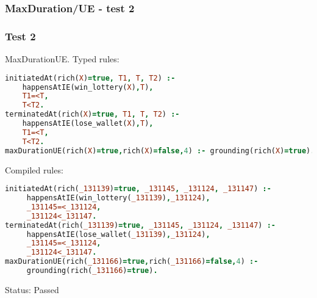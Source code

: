 \documentclass[8pt]{beamer}
\begin{document}
\begin{frame}[fragile]
\frametitle{MaxDuration/UE - test 2}
\subsubsection{Test 2}
\small
MaxDurationUE.\linebreak
Typed rules:
\begin{tiny}
\begin{lstlisting}[language=Prolog]
initiatedAt(rich(X)=true, T1, T, T2) :-
    happensAtIE(win_lottery(X),T),
    T1=<T,
    T<T2.
terminatedAt(rich(X)=true, T1, T, T2) :-
    happensAtIE(lose_wallet(X),T),
    T1=<T,
    T<T2.
maxDurationUE(rich(X)=true,rich(X)=false,4) :- grounding(rich(X)=true).
\end{lstlisting}
\end{tiny}
Compiled rules:
\begin{tiny}
\begin{lstlisting}[language=Prolog]
initiatedAt(rich(_131139)=true, _131145, _131124, _131147) :-
     happensAtIE(win_lottery(_131139),_131124),
     _131145=<_131124,
     _131124<_131147.
terminatedAt(rich(_131139)=true, _131145, _131124, _131147) :-
     happensAtIE(lose_wallet(_131139),_131124),
     _131145=<_131124,
     _131124<_131147.
maxDurationUE(rich(_131166)=true,rich(_131166)=false,4) :- 
     grounding(rich(_131166)=true).
\end{lstlisting}
\end{tiny}
Status: Passed
\end{frame}
\end{document}

